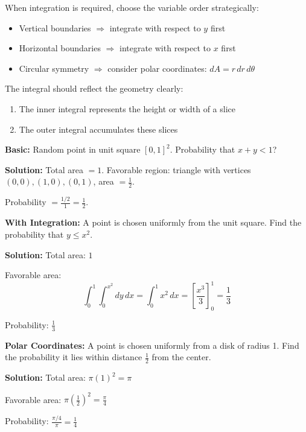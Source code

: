 \documentclass[12pt]{extarticle}
\begin{document}
When integration is required, choose the variable order strategically:
\begin{itemize}
    \item Vertical boundaries $\Rightarrow$ integrate with respect to $y$ first
    \item Horizontal boundaries $\Rightarrow$ integrate with respect to $x$ first
    \item Circular symmetry $\Rightarrow$ consider polar coordinates: $dA = r\,dr\,d\theta$
\end{itemize}

The integral should reflect the geometry clearly:
\begin{enumerate}
    \item The inner integral represents the height or width of a slice
    \item The outer integral accumulates these slices
\end{enumerate}

\begin{examplebox}
\textbf{Basic:} Random point in unit square $[0,1]^2$. Probability that $x + y < 1$?

\textbf{Solution:} Total area $= 1$. Favorable region: triangle with vertices $(0,0), (1,0), (0,1)$, area $= \frac{1}{2}$.

Probability $= \frac{1/2}{1} = \frac{1}{2}$.
\end{examplebox}

\begin{examplebox}
\textbf{With Integration:} A point is chosen uniformly from the unit square. Find the probability that $y \le x^2$.

\textbf{Solution:} Total area: $1$

Favorable area:
\[
\int_0^1 \int_0^{x^2} dy\,dx = \int_0^1 x^2\,dx = \left[\frac{x^3}{3}\right]_0^1 = \frac{1}{3}
\]

Probability: $\boxed{\frac{1}{3}}$
\end{examplebox}

\begin{examplebox}
\textbf{Polar Coordinates:} A point is chosen uniformly from a disk of radius 1. Find the probability it lies within distance $\frac{1}{2}$ from the center.

\textbf{Solution:} Total area: $\pi(1)^2 = \pi$

Favorable area: $\pi\left(\frac{1}{2}\right)^2 = \frac{\pi}{4}$

Probability: $\frac{\pi/4}{\pi} = \boxed{\frac{1}{4}}$
\end{examplebox}
\end{document}
